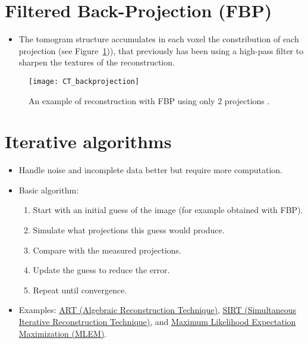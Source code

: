 \section{Filtered Back-Projection (FBP)}
\begin{itemize}
\item The tomogram structure accumulates in each voxel the
  constribution of each projection \cite{abdulla2025acquiring2} (see
  Figure~\ref{fig:CT_reconstruction})), that previously has been
   using a high-pass
  filter to sharpen the textures of the reconstruction.
\end{itemize}

\label{sec:FBP_example}
\vspace{-2ex}
\begin{figure}[!b]
  \centering
  \texttt{[image: CT\_backprojection]}
  \caption{An example of reconstruction with FBP using only 2
    projections
    \cite{abdulla2025acquiring2}.\label{fig:CT_reconstruction}}
\end{figure}

\section{Iterative algorithms}
\begin{itemize}
\item Handle noise and incomplete data better but require more computation.
\item Basic algorithm:
  \begin{enumerate}
  \item Start with an initial guess of the image (for example obtained with FBP).
  \item Simulate what projections this guess would produce.
  \item Compare with the measured projections.
  \item Update the guess to reduce the error.
  \item Repeat until convergence.
  \end{enumerate}
\item Examples:
  \href{https://en.wikipedia.org/wiki/Algebraic_reconstruction_technique}{ART
    (Algebraic Reconstruction Technique)},
  \href{https://tomroelandts.com/articles/the-sirt-algorithm}{SIRT
    (Simultaneous Iterative Reconstruction Technique)}, and
  \href{https://arxiv.org/pdf/1504.06889}{Maximum Likelihood
    Expectation Maximization (MLEM)}.
\end{itemize}

